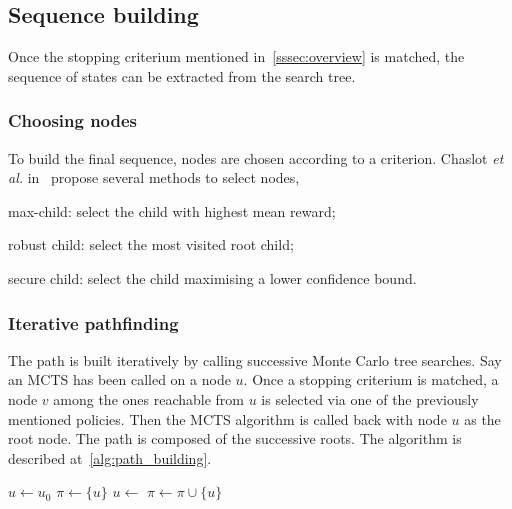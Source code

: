 \documentclass[oneside,twocolumn]{article}
\DeclareMathOperator{\argmax}{argmax}
\begin{document}
\subsection{Sequence building}
Once the stopping criterium mentioned in~\ref{sssec:overview} is matched, the
sequence of states can be extracted from the search tree.

\subsubsection{Choosing nodes}\label{sssec:node_selection}
To build the final sequence, nodes are chosen according to a criterion.
Chaslot \textit{et al.} in~\cite{chaslot2008progstrat} propose several
methods to select nodes,
\begin{compactitem}
  \item max-child: select the child with highest mean reward;
  \item robust child: select the most visited root child;
  \item secure child: select the child maximising a lower confidence bound.
\end{compactitem}

\subsubsection{Iterative pathfinding}
The path is built iteratively by calling successive Monte Carlo tree searches.
Say an MCTS has been called on a node \(u\). Once a stopping criterium is
matched, a node \(v\) among the ones reachable from \(u\) is selected via one of
the previously mentioned policies. Then the MCTS algorithm is called back with
node \(u\)
as the root node. The path is composed of the successive roots. The algorithm is
described at~\ref{alg:path_building}.
\begin{algorithm}
  \caption{%
    Path building. The {\sc NextNode} (here max-child) function is one among
    those in~\ref{sssec:node_selection}.
  }\label{alg:path_building}
  \begin{algorithmic}
    \State{}\(u \gets u_0\)
    \State{}\(\pi \gets \{u\}\)
      \State{}
      \State{}\(u \gets\)
      \State{}\(\pi \gets \pi \cup \{u\}\)
    \EndFor{}
    \State{}\Return{$\pi$}
    \EndFunction{}
    \State{}\Return{$\argmax\{\mu_v | v \text{\,children of\,} u\}$}
    \EndFunction{}
  \end{algorithmic}
\end{algorithm}
\end{document}
